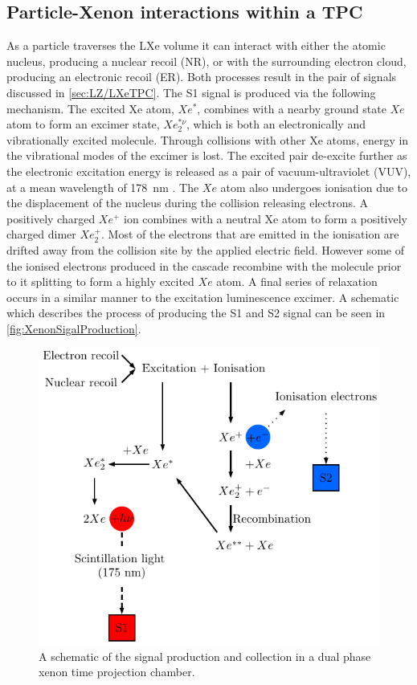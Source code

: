 \subsection{Particle-Xenon interactions within a TPC}
As a particle traverses the LXe volume it can interact with either the atomic nucleus, producing a nuclear recoil (NR), or with the surrounding electron cloud, producing an electronic recoil (ER). Both processes result in the pair of signals discussed in \autoref{sec:LZ/LXeTPC}. The S1 signal is produced via the following mechanism. The excited Xe atom, $Xe^{*}$, combines with a nearby ground state $Xe$ atom to form an excimer state, $Xe_{2}^{*\nu}$, which is both an electronically and vibrationally excited molecule. Through collisions with other Xe atoms, energy in the vibrational modes of the excimer is lost. The excited pair de-excite further as the electronic excitation energy is released as a pair of vacuum-ultraviolet (VUV), at a mean wavelength of 178~nm \cite{Schumann:2014uva}.
The $Xe$ atom also undergoes ionisation due to the displacement of the nucleus during the collision releasing electrons. A positively charged $Xe^{+}$ ion combines with a neutral Xe atom to form a positively charged dimer $Xe^{+}_{2}$. Most of the electrons that are emitted in the ionisation are drifted away from the collision site by the applied electric field. However some of the ionised electrons produced in the cascade recombine with the molecule prior to it splitting to form a highly excited $Xe$ atom. A final series of relaxation occurs in a similar manner to the excitation luminescence excimer. A schematic which describes the process of producing the S1 and S2 signal can be seen in \autoref{fig:XenonSigalProduction}.
\begin{figure}
    \centering
    \includegraphics[width=0.7\linewidth]{figures/LZ/Xenon_interaction.pdf}
    \caption{A schematic of the signal production and collection in a dual phase xenon time projection chamber.}
    \label{fig:XenonSigalProduction}
\end{figure}

